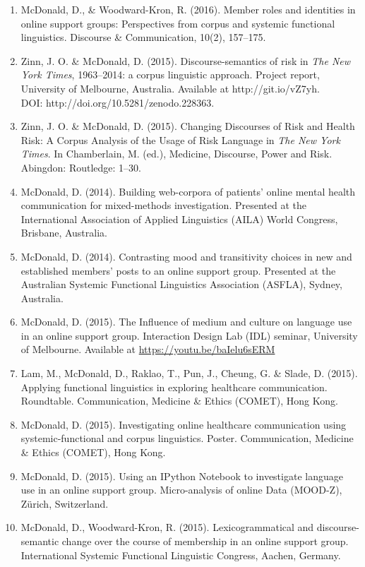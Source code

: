 \documentclass[a4paper,10pt,abstract=on]{scrreprt}
\begin{document}
\begin{enumerate}
    \item McDonald, D., \& Woodward-Kron, R. (2016). Member roles and identities in online support groups: Perspectives from corpus and systemic functional linguistics. Discourse \& Communication, 10(2), 157--175.
    \item Zinn, J. O. \& McDonald, D. (2015). Discourse\hyp{}semantics of risk in \emph{The New York Times}, 1963--2014: a corpus linguistic approach. Project report, University of  Melbourne, Australia. Available at http://git.io/vZ7yh. \\ DOI: http://doi.org/10.5281/zenodo.228363.
    \item Zinn, J. O. \& McDonald, D. (2015). Changing Discourses of Risk and Health Risk: A Corpus Analysis of the Usage of Risk Language in \emph{The New York Times}. In Chamberlain, M. (ed.), Medicine, Discourse, Power and Risk. Abingdon: Routledge: 1--30.
    \item McDonald, D. (2014). Building web-corpora of patients' online mental health communication for mixed-methods investigation. Presented at the International Association of Applied Linguistics (AILA) World Congress, Brisbane, Australia.
    \item McDonald, D. (2014). Contrasting mood and transitivity choices in new and established members' posts to an online support group. Presented at the Australian Systemic Functional Linguistics Association (ASFLA), Sydney, Australia.
    \item McDonald, D. (2015). The Influence of medium and culture on language use in an online support group. Interaction Design Lab (IDL) seminar, University of Melbourne. Available at \url{https://youtu.be/baIelu6sERM}
    \item Lam, M., McDonald, D., Raklao, T., Pun, J., Cheung, G. \& Slade, D. (2015). Applying functional linguistics in exploring healthcare communication. Roundtable. Communication, Medicine \& Ethics (COMET), Hong Kong.
    \item McDonald, D. (2015). Investigating online healthcare communication using systemic-functional and corpus linguistics. Poster. Communication, Medicine \& Ethics (COMET), Hong Kong.
    \item McDonald, D. (2015). Using an IPython Notebook to investigate language use in an online support group. Micro-analysis of online Data (MOOD-Z), Z{\"u}rich, Switzerland.
    \item McDonald, D., Woodward-Kron, R. (2015). Lexicogrammatical and discourse\hyp{}semantic change over the course of membership in an online support group. International Systemic Functional Linguistic Congress, Aachen, Germany.

\end{enumerate}
\end{document}
